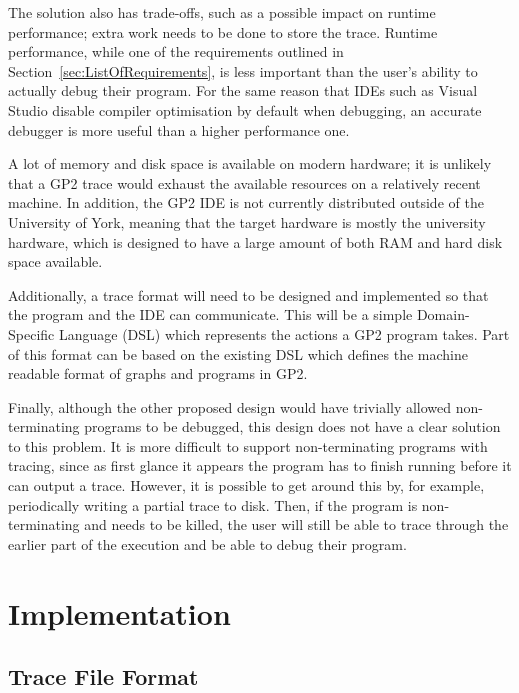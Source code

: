 \documentclass[authoryearcitations]{UoYCSproject}
\begin{document}
The solution also has trade-offs, such as a possible impact on runtime
performance; extra work needs to be done to store the trace. Runtime performance,
while one of the requirements outlined in Section~\ref{sec:ListOfRequirements},
is less important than the user's ability to actually debug their program. For
the same reason that IDEs such as Visual Studio disable compiler optimisation
by default when debugging, an accurate debugger is more useful than a higher
performance one.

A lot of memory and disk space is available on modern hardware; it is unlikely
that a GP2 trace would exhaust the available resources on a relatively recent
machine. In addition, the GP2 IDE is not currently distributed outside of the
University of York, meaning that the target hardware is mostly the university
hardware, which is designed to have a large amount of both RAM and hard disk
space available.

Additionally, a trace format will need to be designed and implemented so that
the program and the IDE can communicate. This will be a simple Domain-Specific
Language (DSL) which represents the actions a GP2 program takes. Part of this
format can be based on the existing DSL which defines the machine readable 
format of graphs and programs in GP2.

Finally, although the other proposed design would have trivially allowed
non-terminating programs to be debugged, this design does not have a clear
solution to this problem. It is more difficult to support non-terminating
programs with tracing, since as first glance it appears the program has to
finish running before it can output a trace. However, it is possible to get
around this by, for example, periodically writing a partial trace to disk. Then,
if the program is non-terminating and needs to be killed, the user will still
be able to trace through the earlier part of the execution and be able to debug
their program.

\clearpage


\chapter{Implementation}
\label{cha:Implementation}

\section{Trace File Format}
\end{document}
